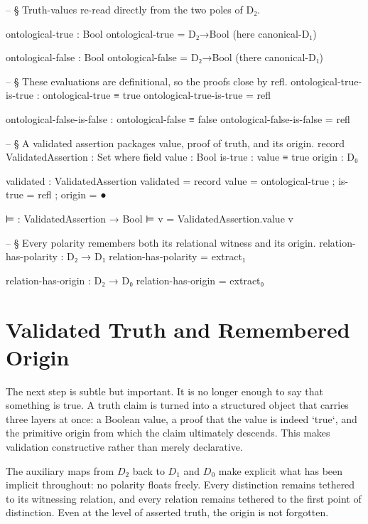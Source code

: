 \documentclass[11pt,a4paper]{book}
\begin{document}
\begin{code}

-- § Truth-values re-read directly from the two poles of D₂.

ontological-true : Bool
ontological-true = D₂→Bool (here canonical-D₁)

ontological-false : Bool
ontological-false = D₂→Bool (there canonical-D₁)

-- § These evaluations are definitional, so the proofs close by refl.
ontological-true-is-true : ontological-true ≡ true
ontological-true-is-true = refl

ontological-false-is-false : ontological-false ≡ false
ontological-false-is-false = refl

-- § A validated assertion packages value, proof of truth, and its origin.
record ValidatedAssertion : Set where
  field
    value : Bool
    is-true : value ≡ true
    origin : D₀

validated : ValidatedAssertion
validated = record
  { value = ontological-true
  ; is-true = refl
  ; origin = ●
  }

⊨ : ValidatedAssertion → Bool
⊨ v = ValidatedAssertion.value v

-- § Every polarity remembers both its relational witness and its origin.
relation-has-polarity : D₂ → D₁
relation-has-polarity = extract₁

relation-has-origin : D₂ → D₀
relation-has-origin = extract₀
\end{code}

\section{Validated Truth and Remembered Origin}

The next step is subtle but important. It is no longer enough to say that something is true. A truth claim is turned into a structured object that carries three layers at once: a Boolean value, a proof that the value is indeed `true`, and the primitive origin from which the claim ultimately descends. This makes validation constructive rather than merely declarative.

The auxiliary maps from $D_2$ back to $D_1$ and $D_0$ make explicit what has been implicit throughout: no polarity floats freely. Every distinction remains tethered to its witnessing relation, and every relation remains tethered to the first point of distinction. Even at the level of asserted truth, the origin is not forgotten.
\end{document}

